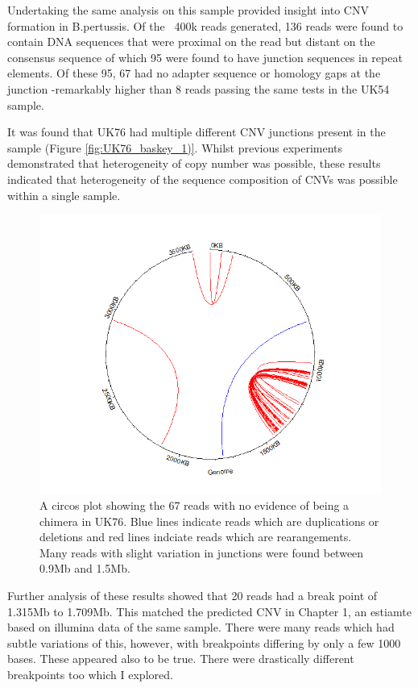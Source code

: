 \documentclass{article}
\begin{document}
Undertaking the same analysis on this sample provided insight into CNV formation in B.pertussis. Of the ~400k reads generated, 136 reads were found to contain DNA sequences that were proximal on the read but distant on the consensus sequence of which 95 were found to have junction sequences in repeat elements. Of these 95, 67 had no adapter sequence or homology gaps at the junction -remarkably higher than 8 reads passing the same tests in the UK54 sample.

It was found that UK76 had multiple different CNV junctions present in the sample (Figure \ref{fig:UK76_baskey_1)}. Whilst previous experiments demonstrated that heterogeneity of copy number was possible, these results indicated that heterogeneity of the sequence composition of CNVs was possible within a single sample. 


\begin{figure}[h!]
\centering
\includegraphics[width=\textwidth{}]{Chapter_2/Rplot136.png}
\caption{A circos plot showing the 67 reads with no evidence of being a chimera in UK76. Blue lines indicate reads which are duplications or deletions and red lines indciate reads which are rearangements. Many reads with slight variation in junctions were found between 0.9Mb and 1.5Mb.}
\label{fig:UK76_baskey_1}
\end{figure}

Further analysis of these results showed that 20 reads had a break point of 1.315Mb to 1.709Mb. This matched the predicted CNV in Chapter 1, an estiamte based on illumina data of the same sample. There were many reads which had subtle variations of this, however, with breakpoints differing by only a few 1000 bases. These appeared also to be true. There were drastically different breakpoints too which I explored.
\end{document}
